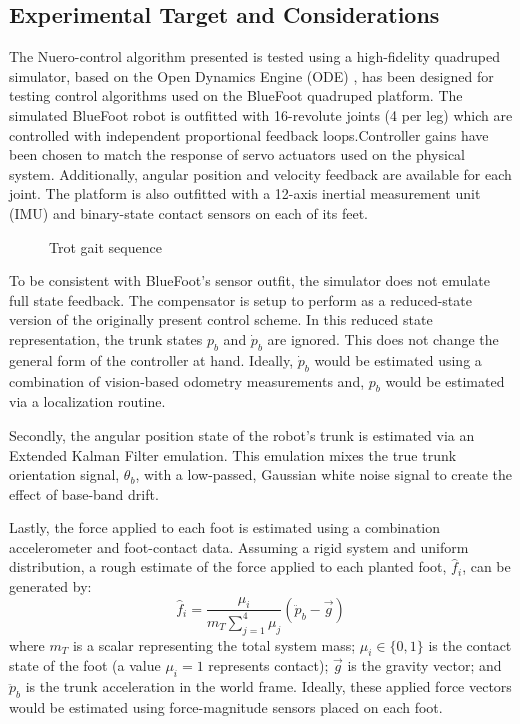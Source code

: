 
\subsection{Experimental Target and Considerations}

The Nuero-control algorithm presented is tested using a high-fidelity quadruped simulator, based on the
Open Dynamics Engine (ODE) \cite{OpenDynamicsEngine}, has been designed for testing control algorithms used on the 
BlueFoot quadruped platform. The simulated BlueFoot robot is outfitted with 16-revolute joints (4 per leg) 
which are controlled with independent proportional feedback loops.Controller gains have been chosen to match 
the response of servo actuators used on the physical system. Additionally, angular position and velocity feedback 
are available for each joint. The platform is also outfitted with a 12-axis inertial measurement unit (IMU) and 
binary-state contact sensors on each of its feet.
	\begin{figure}[t!]
		\centering
		\caption{Trot gait sequence}
		\label{fig::gait_sequence}
		\ImagePostNoGap
	\end{figure}
To be consistent with BlueFoot's sensor outfit, the simulator does not emulate full state feedback. The
compensator is setup to perform as a reduced-state version of the originally present control scheme. In this reduced state 
representation, the trunk states $p_{b}$ and $\dot{p}_{b}$ are ignored. This does not change the general form of the controller 
at hand. Ideally, $\dot{p}_{b}$ would be estimated using a combination of vision-based odometry measurements and, ${p}_{b}$ 
would be estimated via a localization routine. 

Secondly, the angular position state of the robot's trunk is estimated via an Extended Kalman Filter emulation. This emulation
mixes the true trunk orientation signal, $\theta_{b}$, with a low-passed, Gaussian white noise signal to create the effect
of base-band drift.

Lastly, the force applied to each \Ith foot is estimated using a combination accelerometer and foot-contact data. 
Assuming a rigid system and uniform distribution, a rough estimate of the force 
applied to each \Ith planted foot, $\hat{f}_{i}$, can be generated by:
	\begin{equation}
		\hat{f}_{i} = \frac{\mu_{i}}{m_{T} \sum_{j=1}^{4}{\mu_{j}} } \left( \ddot{p}_{b} - \vec{g}\right)
	\end{equation}
where $m_{T}$ is a scalar representing the total system mass; $\mu_{i}\in \{0,1\}$ is the contact state of the \Ith
foot (a value $\mu_{i}=1$ represents contact); $\vec{g}$ is the gravity vector; and $\ddot{p}_{b}$ is the trunk
acceleration in the world frame. Ideally, these applied force vectors would be estimated using force-magnitude sensors 
placed  on each foot.

